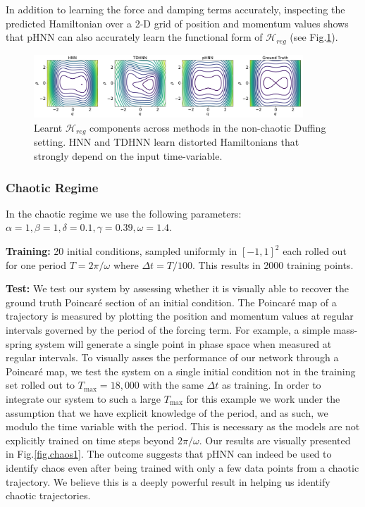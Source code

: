 \documentclass{article}
\begin{document}
In addition to learning the force and damping terms accurately, inspecting the predicted Hamiltonian over a 2-D grid of position and momentum values shows that pHNN can also accurately learn the functional form of $\mathcal{H}_{reg}$ (see Fig.\ref{duffing_ham}).

\begin{figure}[h]
\centering
\includegraphics[width=0.9\textwidth]{figures/figures/duffing/1/duffing_hamiltonian_0.pdf}
\caption{Learnt $\mathcal{H}_{reg}$ components across methods in the non-chaotic Duffing setting. HNN and TDHNN learn distorted Hamiltonians that strongly depend on the input time-variable.}
\label{duffing_ham}
\end{figure}


\subsubsection{Chaotic Regime}

In the chaotic regime we use the following parameters:
$\alpha =1,\beta=1,\delta=0.1,\gamma=0.39,\omega=1.4$. 

\textbf{Training:} 20 initial conditions, sampled uniformly in $[-1,1]^2$ each rolled out for one period $T=2\pi/\omega$ where $\Delta t = T/100$. This results in 2000 training points.

\textbf{Test:} We test our system by assessing whether it is visually able to recover the ground truth Poincar\'e section of an initial condition. The Poincar\'e map of a trajectory is measured by plotting the position and momentum values at regular intervals governed by the period of the forcing term. For example, a simple mass-spring system will generate a single point in phase space when measured at regular intervals. To visually asses the performance of our network through a Poincar\'e map, we test the system on a single initial condition not in the training set rolled out to $T_{\max} = 18,000$ with the same $\Delta t$ as training. In order to integrate our system to such a large $T_{\max}$ for this example we work under the assumption that we have explicit knowledge of the period, and as such, we modulo the time variable with the period. This is necessary as the models are not explicitly trained on time steps beyond $2\pi/\omega$. Our results are visually presented in Fig.\ref{fig.chaos1}. The outcome suggests that pHNN can indeed be used to identify chaos even after being trained with only a few data points from a chaotic trajectory. We believe this is a deeply powerful result in helping us identify chaotic trajectories.
\end{document}
